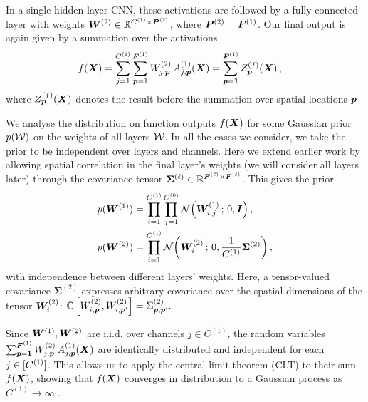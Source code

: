 \documentclass[accepted]{uai2021} %
\newcommand{\layerAs}[2]{Z^{(#1)}_{#2}(\vX)}
\newcommand{\layerC}[1]{C^{(#1)}}
\newcommand{\layerNLAs}[2]{A^{(#1)}_{#2}(\vX)}
\newcommand{\layerWs}[1]{W^{(#1)}}
\newcommand{\layerW}[1]{\mW^{(#1)}}
\newcommand{\layersizebase}{\vF}
\newcommand{\layersize}[1]{{\layersizebase^{\bra{#1}}}}
\newcommand{\patchsizebase}{\vP}
\newcommand{\patchsize}[1]{{\patchsizebase^{\bra{#1}}}}
\newcommand{\priorWcovs}[1]{\Sigma^{(#1)}}
\newcommand{\priorWcov}[1]{\boldsymbol{\Sigma}^{(#1)}}
\newcommand{\chan}{i}
\newcommand{\prevchan}{j}   %
\newcommand{\patch}{\vp}               %
\newcommand{\0}{\boldsymbol{0}}
\newcommand{\1}{\boldsymbol{1}}
\begin{document}
In a single hidden layer CNN, these activations are followed by a fully-connected layer with weights $\layerW{2} \in \sR^{\layerC 1\times \patchsize{2}}$, where $\patchsize{2} = \layersize{1}$. Our final output is again given by a summation over the activations
\begin{align}
  f(\mX) &= \sum_{\prevchan=1}^{\layerC{1}} \sum_{\patch=1}^{\layersize{1}} \layerWs{2}_{\prevchan,\patch}\, \layerNLAs{1}{\prevchan,\patch}
         = \sum_{\patch=\1}^{\layersize{1}} \layerAs{f}{\patch}
        \label{eq:single-layer-f} \,,
\end{align}
where $\layerAs{f}{\patch}$ denotes the result before the summation over spatial locations $\patch$.

We analyse the distribution on function outputs $f({\bm{X}})$ for some Gaussian prior
$p({\mathcal{W}})$ on the weights of all layers ${\mathcal{W}}$. In all the cases
we consider, we take the prior to be independent over layers and channels. Here
we extend earlier work by allowing spatial correlation in the final layer's
weights (we will consider all layers later) through the covariance tensor
$\priorWcov{\ell} \in \sR^{\layersize{\ell}\times\layersize{\ell}}$. This gives
the prior
\begin{align}
    p(\layerW1) &= \prod_{\chan=1}^{\layerC1}\prod_{\prevchan=1}^{\layerC0}\Normal{\layerW1_{\chan,\prevchan}\,;\, 0, \eye} \,, \\
     p(\layerW2) &= \prod_{\chan=1}^{\layerC1} \Normal{\layerW2_{\chan}\,;\, 0, \frac{1}{\layerC1}\priorWcov2} \,,
\end{align}
with independence between different layers' weights.
Here, a tensor-valued covariance $\priorWcov2$ expresses arbitrary covariance over the spatial dimensions of the tensor $\layerW{2}_{\chan}$: $\Cov\sqb{\layerWs{2}_{\chan,\patch},\layerWs{2}_{\chan,\patch'}} = \priorWcovs{2}_{\patch,\patch'}.$

Since $\layerW1,\layerW2$ are i.i.d. over channels $\prevchan\in\layerC{1}$, the random variables
$\sum_{\patch=\1}^{\layersize{1}}  \layerWs{2}_{\prevchan,\patch}\, \layerNLAs{1}{\prevchan,\patch}$ are identically distributed and independent for each $\prevchan \in \countto{\layerC{1}}$.
This allows us to apply the central limit theorem (CLT) to their sum $f({\bm{X}})$, showing that $f({\bm{X}})$ converges in distribution to a Gaussian process as $\layerC1\to\infty$ \citep{neal1996bayesian}.
\end{document}
